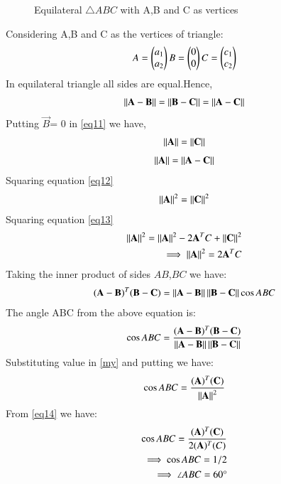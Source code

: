 \documentclass[journal,12pt,twocolumn]{IEEEtran}
\begin{document}
\renewcommand{\thefigure}{1}
\begin{figure}[!ht]
\centering
\resizebox{\columnwidth}{!}{}
\caption{Equilateral $\triangle{ABC}$ with A,B and C as vertices}
\label{fig:tri_right_angle}
\end{figure}
Considering A,B and C as the vertices of triangle:
\begin{align}
   A=
\begin{pmatrix}
a_1\\
a_2
\end{pmatrix}
B=
\begin{pmatrix}
0\\
0
\end{pmatrix}
C=
\begin{pmatrix}
c_1\\
c_2
\end{pmatrix} \nonumber
\end{align}
In equilateral triangle all sides are equal.Hence,
\begin{align}\label{eq11}
\left\lVert\mathbf{A-B}\right\rVert = \left\lVert\mathbf{B-C}\right\rVert = \left\lVert\mathbf{A-C}\right\rVert
\end{align}
Putting $\vec{B}$= 0 in \ref {eq11} we have,
\begin{align}\label{eq12}
\left\lVert\mathbf{A}\right\rVert=\left\lVert\mathbf{C}\right\rVert
\end{align}
\begin{align}\label{eq13}
\left\lVert\mathbf{A}\right\rVert=\left\lVert\mathbf{A-C}\right\rVert
\end{align}
Squaring  equation \ref{eq12}
 \begin{align}\label{eq17}
\left\lVert\mathbf{A}\right\rVert^2=\left\lVert\mathbf{C}\right\rVert^2
\end{align}
Squaring  equation \ref{eq13}
 \begin{align}\label{eq14}
\left\lVert\mathbf{A}\right\rVert^2=\left\lVert\mathbf{A}\right\rVert^2 - 2\mathbf{A}^T C +\left\lVert\mathbf{C}\right\rVert^2 \nonumber \\
\implies \left\lVert\mathbf{A}\right\rVert^2=2\mathbf{A}^T C
\end{align}
Taking the inner product of sides $AB$,$BC$ we have:
\begin{align}
    (\mathbf{A}-\mathbf{B})^T(\mathbf{B}-\mathbf{C}) =
    \left\lVert\mathbf{A}-\mathbf{B}\right\rVert\left\lVert\mathbf{B}-\mathbf{C}\right\rVert\cos{ABC}
\end{align}
The angle ABC from the  above equation is:
\begin{align}\label{my}
     \cos{ABC} = \frac{(\mathbf{A}-\mathbf{B})^T(\mathbf{B}-\mathbf{C})}{\left\lVert\mathbf{A}-\mathbf{B}\right\rVert\left\lVert\mathbf{B}-\mathbf{C}\right\rVert} 
\end{align}
Substituting value in \ref{my} and putting we have:
\begin{align}\label{my1}
     \cos{ABC} = \frac{(\mathbf{A})^T(\mathbf{C})}{\left\lVert\mathbf{A}\right\rVert^2}
\end{align}
From \ref{eq14} we have:
\begin{align}\label{my22}
     \cos{ABC} = \frac{(\mathbf{A})^T(\mathbf{C})}{2(\mathbf{A})^T (C)}\nonumber\\
     \implies \cos{ABC} = 1/2\nonumber\\
\implies \angle {ABC =60 \degree}
\end{align}
\end{document}
